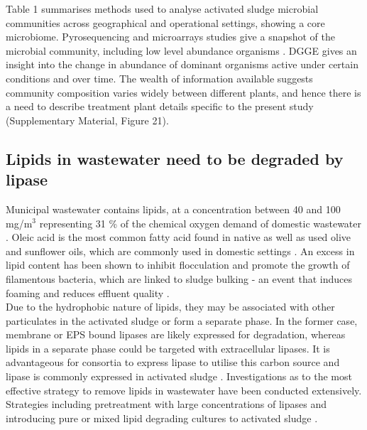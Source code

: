 \documentclass[twoside]{article}
\begin{document}
Table 1 summarises methods used to analyse activated sludge microbial communities across geographical and operational settings, showing a core microbiome. Pyrosequencing and microarrays studies give a snapshot of the microbial community, including low level abundance organisms \cite{ranasinghe2012revealing}. DGGE gives an insight into the change in abundance of dominant organisms active under certain conditions and over time. The wealth of information available suggests community composition varies widely between different plants, and hence there is a need to describe treatment plant details specific to the present study (Supplementary Material, Figure 21).
\FloatBarrier

\subsection{Lipids in wastewater need to be degraded by lipase}
Municipal wastewater contains lipids, at a concentration between 40 and 100 mg/m$^{3}$ \cite{Forster_92} representing 31 \% of the chemical oxygen demand of domestic wastewater \cite{Raunkjaer_94}. Oleic acid is the most common fatty acid found in native as well as used olive and sunflower oils, which are commonly used in domestic settings \cite{haba2000isolation}.  An excess in lipid content has been shown to inhibit flocculation and promote the growth of filamentous bacteria, which are linked to sludge bulking - an event that induces foaming and reduces effluent quality \cite{Forster_92}.\\

Due to the hydrophobic nature of lipids, they may be associated with other particulates in the activated sludge or form a separate phase. In the former case, membrane or EPS bound lipases are likely expressed for degradation, whereas lipids in a separate phase could be targeted with extracellular lipases. It is advantageous for consortia to express lipase to utilise this carbon source and lipase is commonly expressed in activated sludge \cite{gessesse2003lipase}. Investigations as to the most effective strategy to remove lipids in wastewater have been conducted extensively. Strategies including pretreatment with large concentrations of lipases and introducing pure or mixed lipid degrading cultures to activated sludge \cite{Wakelin_97}. \\%
\end{document}
